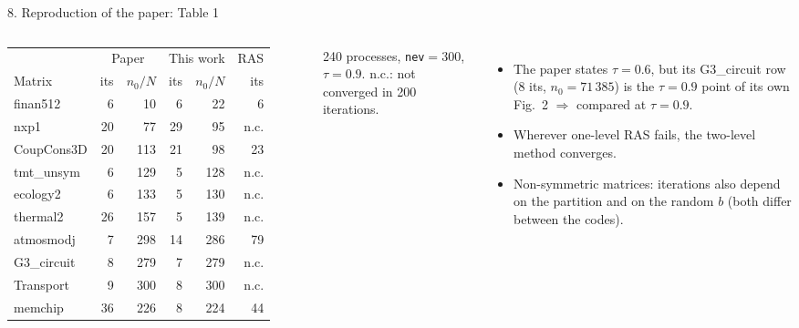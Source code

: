 \documentclass[aspectratio=169,10pt]{beamer}
\newcommand{\muted}[1]{{\color{ink2}#1}}
\begin{document}
\begin{frame}{8. Reproduction of the paper: Table 1}
  \begin{columns}[c,onlytextwidth]
    \footnotesize
    \begin{tabular}{@{}lrrrrr@{}}
      \toprule
      & \multicolumn{2}{c}{Paper} & \multicolumn{2}{c}{This work} & RAS\\
      \cmidrule(lr){2-3}\cmidrule(lr){4-5}
      Matrix & its & $n_0/N$ & its & $n_0/N$ & its\\
      \midrule
      finan512    & 6  & 10  & 6  & 22  & 6\\
      nxp1        & 20 & 77  & \color{gamg}29 & 95  & n.c.\\
      CoupCons3D  & 20 & 113 & 21 & 98  & 23\\
      tmt\_unsym  & 6  & 129 & 5  & 128 & n.c.\\
      ecology2    & 6  & 133 & 5  & 130 & n.c.\\
      thermal2    & 26 & 157 & \color{schwarz}5  & 139 & n.c.\\
      atmosmodj   & 7  & 298 & \color{gamg}14 & 286 & 79\\
      G3\_circuit & 8  & 279 & 7  & 279 & n.c.\\
      Transport   & 9  & 300 & 8  & 300 & n.c.\\
      memchip     & 36 & 226 & \color{schwarz}8  & 224 & 44\\
      \bottomrule
    \end{tabular}\par\vspace{1mm}
    {\scriptsize\muted{240 processes, \texttt{nev}$=300$, $\tau=0.9$. n.c.: not converged in 200 iterations.}}
    \small
    \begin{itemize}
      \item The paper states $\tau=0.6$, but its G3\_circuit row (8 its, $n_0=71\,385$) is the $\tau=0.9$
            point of its own Fig.~2 $\Rightarrow$ compared at \alert{$\tau=0.9$}.
      \item Wherever one-level RAS fails, the two-level method converges.
      \item Non-symmetric matrices: iterations also depend on the partition and on the random $b$
            (both differ between the codes).
    \end{itemize}
  \end{columns}
\end{frame}
\end{document}
